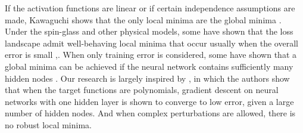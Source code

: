If the activation functions are linear or
if certain independence assumptions are made, Kawaguchi shows that the
only local minima are the global minima \cite{Kawaguchi16a}. Under the
spin-glass and other physical models, some have shown that the loss
landscape admit well-behaving local minima that occur usually when the
overall error is small
\cite{ChoromanskaHMAL14},\cite{DauphinPGCGB14}. When only training
error is considered, some have shown that a global minima can be
achieved if the neural network contains sufficiently many hidden nodes
\cite{SoudryC16}. Our research is largely inspired by
\cite{valiant2014learning}, in which the authors show that when the
target functions are polynomials, gradient descent on neural networks
with one hidden layer is shown to converge to low error, given a large
number of hidden nodes. And when complex perturbations are allowed,
there is no robust local minima.
